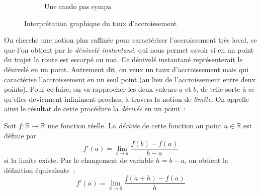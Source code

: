 \begin{figure}[H]
\begin{subfigure}[b]{0.45\textwidth}
         \caption{Une rando pas sympa}
         \label{fig:three sin x}
     \end{subfigure}
    \caption{Interprétation graphique du taux d'accroissement}
    \label{fig:differential_calculus_figure_plot_4}
\end{figure}

On cherche une notion plus raffinée pour caractériser l'accroissement très local, ce que l'on obtient par le \emph{dénivelé instantané}, qui nous permet savoir si en un point du trajet la route est escarpé ou non. Ce dénivelé instantané représenterait le dénivelé en un point. Autrement dit, on veux un taux d'accroissement mais qui caractérise l'accroissement en un seul point (au lieu de l'accroissement entre deux points). Pour ce faire, on va rapprocher les deux valeurs $a$ et $b$, de telle sorte à ce qu'elles deviennent infiniment proches, à travers la notion de \emph{limite}. On appelle ainsi le résultat de cette procédure la \emph{dérivée} en un point~:
\begin{boxdef}
    Soit $f : \mathbb{R} \to \mathbb{R}$ une fonction réelle. La \emph{dérivée} de cette fonction au point $a \in \mathbb{R}$ est définie par
    \begin{equation}
    f'(a) = \lim_{b \to a} \frac{f(b) - f(a)}{b - a}
    \end{equation}
    si la limite existe.
    Par le changement de variable $h = b - a$, on obtient la définition équivalente~:
    \begin{equation}
    f'(a) = \lim_{h \to 0} \frac{f(a + h) - f(a)}{h}
    \end{equation}
\end{boxdef}

